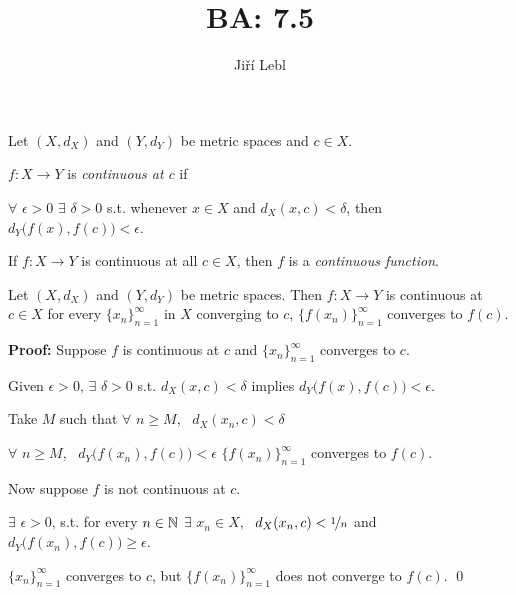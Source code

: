 \documentclass[10pt,aspectratio=169]{beamer}
\author{Ji\v{r}\'i Lebl}
\institute[OSU]{%
Departemento pri Matematiko de Oklahoma {\^S}tata Universitato}
\title{BA: 7.5}
\date{}
\begin{document}
\begin{frame}
\titlepage
\end{frame}

\begin{frame}
\begin{definition}
Let $(X,d_X)$ and $(Y,d_Y)$ be metric spaces and $c \in X$.

\pause
$f \colon X \to Y$ is
\emph{continuous at $c$} if

\pause
$\forall$ $\epsilon > 0$
$\exists$ $\delta > 0$ s.t. whenever $x \in X$ and $d_X(x,c) < \delta$, then
$d_Y\bigl(f(x),f(c)\bigr) < \epsilon$.

\pause
\medskip

If $f \colon X \to Y$ is continuous at all $c \in X$, then
$f$ is a \emph{continuous function}.
\end{definition}

\pause
\begin{proposition}
Let $(X,d_X)$ and $(Y,d_Y)$ be metric spaces.
\pause
Then $f \colon X \to Y$ is
continuous at $c \in X$
\pause
\wiffif for every $\{ x_n \}_{n=1}^\infty$ in $X$
converging to $c$, $\bigl\{ f(x_n) \bigr\}_{n=1}^\infty$ converges
to $f(c)$.
\end{proposition}

\pause
\textbf{Proof:}
Suppose $f$ is continuous at $c$ and $\{ x_n \}_{n=1}^\infty$ converges to
$c$.

\pause
Given $\epsilon > 0$, $\exists$ $\delta > 0$ s.t. $d_X(x,c) < \delta$ implies
$d_Y\bigl(f(x),f(c)\bigr) < \epsilon$.

\pause
Take $M$ such that 
$\forall$ $n \geq M$, ~$d_X(x_n,c) < \delta$

\pause
\thus \quad $\forall$ $n \geq M$, ~$d_Y\bigl(f(x_n),f(c)\bigr) < \epsilon$
\pause
\wthus $\bigl\{ f(x_n) \bigr\}_{n=1}^\infty$
converges to $f(c)$.

\pause
\medskip

Now suppose $f$ is not continuous at $c$.

\pause
$\exists$ $\epsilon > 0$, s.t. for every $n \in {\mathbb{N}}$ $\exists$ $x_n \in X$,
~$d_X(x_n,c) < \nicefrac{1}{n}$ and $d_Y\bigl(f(x_n),f(c)\bigr) \geq \epsilon$.

\pause
\thus \quad $\{ x_n \}_{n=1}^\infty$ converges to $c$, but
$\bigl\{ f(x_n) \bigr\}_{n=1}^\infty$
does not converge to $f(c)$.
\qed

\end{frame}
\end{document}

